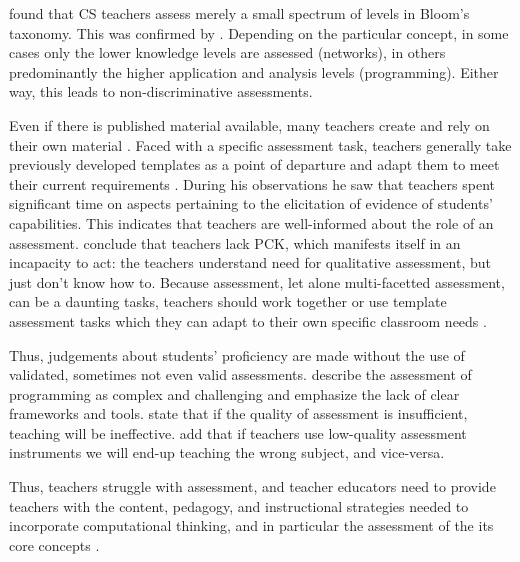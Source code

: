 found that CS teachers assess merely a small spectrum of levels in Bloom's taxonomy. This was confirmed by . Depending on the particular concept, in some cases only the lower knowledge levels are assessed (networks), in others predominantly the higher application and analysis levels (programming). Either way, this leads to non-discriminative assessments.


Even if there is published material available, many teachers create and rely on their own material \cite{popham2009assessment}. Faced with a specific assessment task, teachers generally take previously developed templates as a point of departure and adapt them to meet their current requirements \cite{hermansen2014reworking}. During his observations he saw that teachers spent significant time on aspects pertaining to the elicitation of evidence of students' capabilities. This indicates that teachers are well-informed about the role of an assessment.  conclude that teachers lack PCK, which manifests itself in an incapacity to act: the teachers understand need for qualitative assessment, but just don't know how to. Because assessment, let alone multi-facetted assessment, can be a daunting tasks, teachers should work together or use template assessment tasks which they can adapt to their own specific classroom needs \cite{hermansen2014reworking}.



Thus, judgements about students' proficiency are made without the use of validated, sometimes not even valid assessments.  describe the assessment of programming as complex and challenging and emphasize the lack of clear frameworks and tools.  state that if the quality of assessment is insufficient, teaching will be ineffective.  add that if teachers use low-quality assessment instruments we will end-up teaching the wrong subject, and vice-versa.


Thus, teachers struggle with assessment, and teacher educators need to provide teachers with the content, pedagogy, and instructional strategies needed to incorporate computational thinking, and in particular the assessment of the its core concepts \cite{Yadav2017CTteacherEd}.







